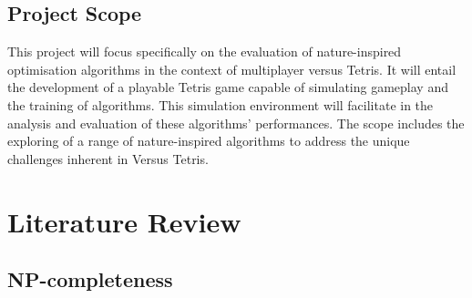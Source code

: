 \documentclass[a4paper, 12pt]{extreport}
\begin{document}
		\section{Project Scope}
			
			
			This project will focus specifically on the evaluation of nature-inspired optimisation algorithms in the context of multiplayer versus Tetris. It will entail the development of a playable Tetris game capable of simulating gameplay and the training of algorithms. This simulation environment will facilitate in the analysis and evaluation of these algorithms' performances. The scope includes the exploring of a range of nature-inspired algorithms to address the unique challenges inherent in Versus Tetris.
			
		
	
	\chapter{Literature Review}
		
		
		\section{NP-completeness}
			
\end{document}
